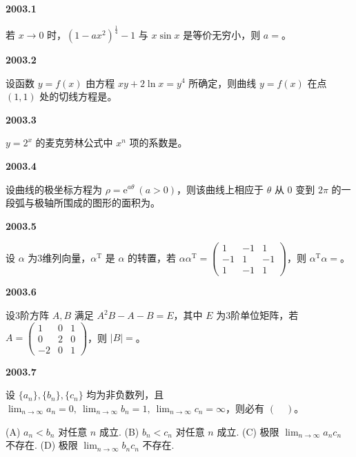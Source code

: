 \documentclass[UTF8,12pt,fontset=windows]{ctexart}
\begin{document}
{\large\bfseries 2003.1}

若 $x\to0$ 时，$(1-ax^2)^{\frac{1}{4}}-1$ 与 $x\sin x$ 是等价无穷小，则 $a=$\underline{\hspace{20mm}}。

\vfill
\newpage
{\large\bfseries 2003.2}

设函数 $y=f(x)$ 由方程 $xy+2\ln x=y^4$ 所确定，则曲线 $y=f(x)$ 在点 $(1,1)$ 处的切线方程是\underline{\hspace{20mm}}。

\vfill
\newpage
{\large\bfseries 2003.3}

$y=2^x$ 的麦克劳林公式中 $x^n$ 项的系数是\underline{\hspace{20mm}}。

\vfill
\newpage
{\large\bfseries 2003.4}

设曲线的极坐标方程为 $\rho=\mathrm{e}^{a\theta}\ (a>0)$，则该曲线上相应于 $\theta$ 从 $0$ 变到 $2\pi$ 的一段弧与极轴所围成的图形的面积为\underline{\hspace{20mm}}。

\vfill
\newpage
{\large\bfseries 2003.5}

设 $\alpha$ 为3维列向量，$\alpha^{\mathrm{T}}$ 是 $\alpha$ 的转置，若 $\alpha\alpha^{\mathrm{T}}=\begin{pmatrix}1&-1&1\\-1&1&-1\\1&-1&1\end{pmatrix}$，则 $\alpha^{\mathrm{T}}\alpha=$\underline{\hspace{20mm}}。

\vfill
\newpage
{\large\bfseries 2003.6}

设3阶方阵 $A,B$ 满足 $A^2B-A-B=E$，其中 $E$ 为3阶单位矩阵，若 $A=\begin{pmatrix}1&0&1\\0&2&0\\-2&0&1\end{pmatrix}$，则 $|B|=$\underline{\hspace{20mm}}。

\vfill
\newpage
{\large\bfseries 2003.7}

设 $\{a_n\},\{b_n\},\{c_n\}$ 均为非负数列，且 $\lim_{n\to\infty}a_n=0,\ \lim_{n\to\infty}b_n=1,\ \lim_{n\to\infty}c_n=\infty$，则必有 $(\quad)$。

(A) $a_n<b_n$ 对任意 $n$ 成立.  (B) $b_n<c_n$ 对任意 $n$ 成立.  (C) 极限 $\lim_{n\to\infty}a_nc_n$ 不存在.  (D) 极限 $\lim_{n\to\infty}b_nc_n$ 不存在.
\end{document}
